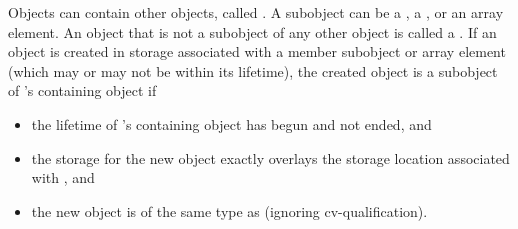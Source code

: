 \pnum
{}%
Objects can contain other objects, called .
A subobject can be
a , a ,
or an array element.
%
An object that is not a subobject of any other object is called a .
If an object is created
in storage associated with a member subobject or array element 
(which may or may not be within its lifetime),
the created object
is a subobject of 's containing object if
\begin{itemize}
\item
the lifetime of 's containing object has begun and not ended, and
\item
the storage for the new object exactly overlays the storage location associated with , and
\item
the new object is of the same type as  (ignoring cv-qualification).
\end{itemize}

